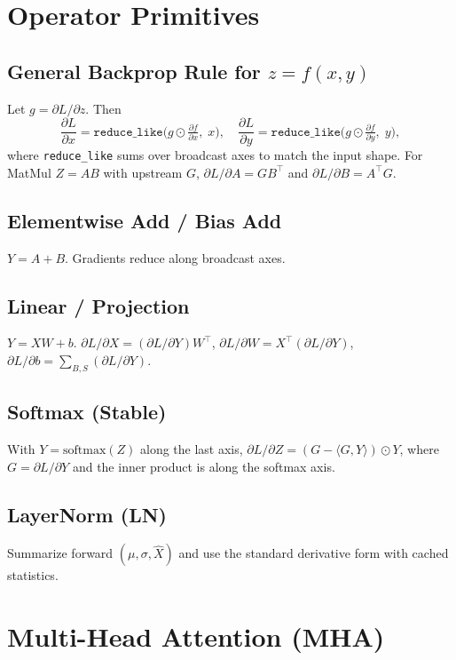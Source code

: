 \documentclass[10pt]{article}
\begin{document}
\section{Operator Primitives}
\subsection{General Backprop Rule for $z=f(x,y)$}
Let $g = \partial L/\partial z$. Then
\begin{equation}
\frac{\partial L}{\partial x} = \texttt{reduce\_like}\big(g\odot \tfrac{\partial f}{\partial x},\; x\big),\quad
\frac{\partial L}{\partial y} = \texttt{reduce\_like}\big(g\odot \tfrac{\partial f}{\partial y},\; y\big),
\end{equation}
where \texttt{reduce\_like} sums over broadcast axes to match the input shape. For MatMul $Z=AB$ with upstream $G$, $\partial L/\partial A=GB^{\top}$ and $\partial L/\partial B=A^{\top}G$.

\subsection{Elementwise Add / Bias Add}
$Y=A+B$. Gradients reduce along broadcast axes.

\subsection{Linear / Projection}
$Y= XW + b$. $\partial L/\partial X=(\partial L/\partial Y)W^{\top}$, $\partial L/\partial W=X^{\top}(\partial L/\partial Y)$, $\partial L/\partial b=\sum\limits_{B,S}(\partial L/\partial Y)$.

\subsection{Softmax (Stable)}
With $Y=\text{softmax}(Z)$ along the last axis, $\partial L/\partial Z=(G-\langle G,Y\rangle)\odot Y$, where $G=\partial L/\partial Y$ and the inner product is along the softmax axis.

\subsection{LayerNorm (LN)}
Summarize forward $(\mu,\sigma,\hat X)$ and use the standard derivative form with cached statistics.

\section{Multi-Head Attention (MHA)}
\end{document}

